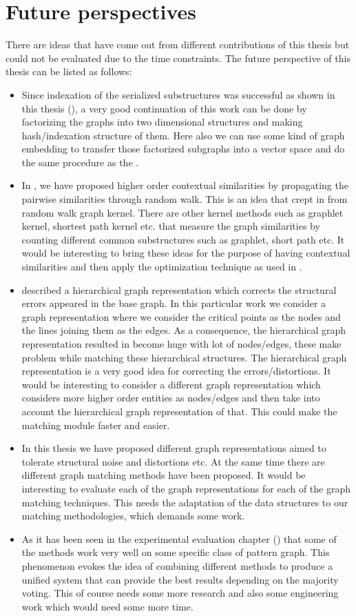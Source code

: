 \section{Future perspectives}
There are ideas that have come out from different contributions of this thesis but could not be evaluated due to the time constraints. The future perspective of this thesis can be listed as follows:
\begin{itemize}
\item Since indexation of the serialized substructures was successful as shown in this thesis (), a very good continuation of this work can be done by factorizing the graphs into two dimensional structures and making hash/indexation structure of them. Here also we can use some kind of graph embedding to transfer those factorized subgraphs into a vector space and do the same procedure as the .
\item In , we have proposed higher order contextual similarities by propagating the pairwise similarities through random walk. This is an idea that crept in from random walk graph kernel. There are other kernel methods such as graphlet kernel, shortest path kernel etc. that measure the graph similarities by counting different common substructures such as graphlet, short path etc. It would be interesting to bring these ideas for the purpose of having contextual similarities and then apply the optimization technique as used in .
\item {} described a hierarchical graph representation which corrects the structural errors appeared in the base graph. In this particular work we consider a graph representation where we consider the critical points as the nodes and the lines joining them as the edges. As a consequence, the hierarchical graph representation resulted in become huge with lot of nodes/edges, these make problem while matching these hierarchical structures. The hierarchical graph representation is a very good idea for correcting the errors/distortions. It would be interesting to consider a different graph representation which considers more higher order entities as nodes/edges and then take into account the hierarchical graph representation of that. This could make the matching module faster and easier.
\item In this thesis we have proposed different graph representations aimed to tolerate structural noise and distortions etc. At the same time there are different graph matching methods have been proposed. It would be interesting to evaluate each of the graph representations for each of the graph matching techniques. This needs the adaptation of the data structures to our matching methodologies, which demands some work.
\item As it has been seen in the experimental evaluation chapter () that some of the methods work very well on some specific class of pattern graph. This phenomenon evokes the idea of combining different methods to produce a unified system that can provide the best results depending on the majority voting. This of course needs some more research and also some engineering work which would need some more time.
\end{itemize}